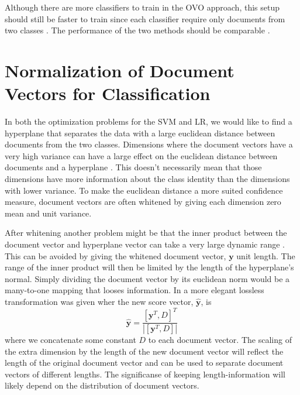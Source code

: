 Although there are more classifiers to train in the OVO approach, this setup should still be faster to train since each classifier require only documents from two classes \cite[832]{lidbok}. The performance of the two methods should be comparable \cite{Rifkin:2004:DOC:1005332.1005336}.

\section{Normalization of Document Vectors for Classification}
\label{sect:svmnormal}

In both the optimization problems for the SVM and LR, we would like to find a hyperplane that separates the data with a large euclidean distance between documents from the two classes. Dimensions where the document vectors have a very high variance can have a large effect on the euclidean distance between documents and a hyperplane \cite{wan2005speaker}. This doesn't necessarily mean that those dimensions have more information about the class identity than the dimensions with lower variance. To make the euclidean distance a more suited confidence measure, document vectors are often whitened by giving each dimension zero mean and unit variance. 

After whitening another problem might be that the inner product between the document vector and hyperplane vector can take a very large dynamic range \cite{wan2005speaker}. This can be avoided by giving the whitened document vector, $\mathbf{y}$ unit length. The range of the inner product will then be limited by the length of the hyperplane's normal. Simply dividing the document vector by its euclidean norm would be a many-to-one mapping that looses information. In \cite{wan2005speaker} a more elegant lossless transformation was given wher the new score vector, $\mathbf{\hat{y}}$, is
\begin{equation}
\label{svmnormalize}
\mathbf{\hat{y}} = \frac{[\mathbf{y}^T, D]^T}{|[\mathbf{y}^T, D]|}
\end{equation}
where we concatenate some constant $D$ to each document vector. The scaling of the extra dimension by the length of the new document vector will reflect the length of the original document vector and can be used to separate document vectors of different lengths. The significanse of keeping length-information will likely depend on the distribution of document vectors.